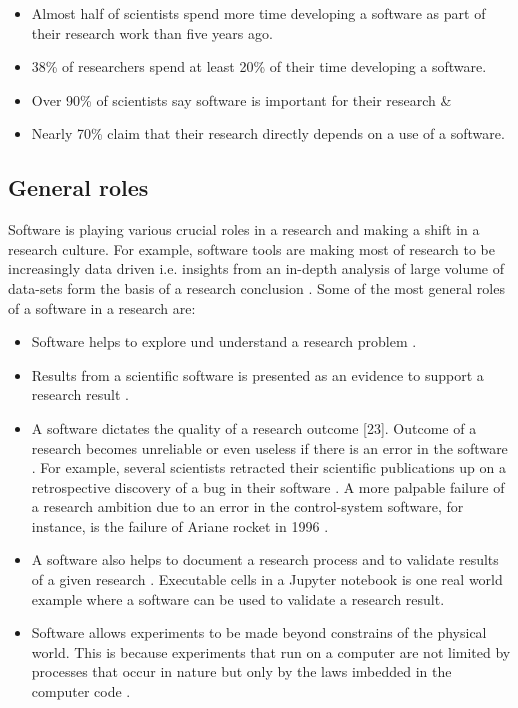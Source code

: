 \begin{itemize}[noitemsep,topsep=5pt, leftmargin=0.3in] %
	\item Almost half of scientists spend more time developing a software as part of their research work than five years ago.
	\item 38\% of researchers spend at least 20\% of their time developing a software.
	\item Over 90\% of scientists say software is important for their research \&
	\item Nearly 70\% claim that their research directly depends on a use of a software.  

\end{itemize}

\subsection{General roles}

Software is playing various crucial roles in a research and making a shift in a research culture. For example, software tools are making most of research to be increasingly data driven i.e. insights from an in-depth analysis of large volume of data-sets form the basis of a research conclusion \cite{goble2014better}\cite{jay2020software}. Some of the most general roles of a software in a research are:

\begin{itemize}[noitemsep,topsep=5pt, leftmargin=0.5in] %

	\item Software helps to explore und understand a research problem \cite{hannay2009scientists}.
	\item Results from a scientific software is presented as an evidence to support a research result \cite{kanewala2014testing}. 
	\item A software dictates the quality of a research outcome\cite{hannay2009scientists} [23]. Outcome of a research becomes unreliable or even useless if there is an error in the software \cite{soergel2014rampant}. For example, several scientists retracted their scientific publications up on a retrospective discovery of a bug in their software \cite{wilson2014best}\cite{merali2010computational}\cite{miller2006scientist}. A more palpable failure of a research ambition due to an error in the control-system software, for instance, is the failure of Ariane rocket in 1996 \cite{enwiki:1054482061}.  
	\item A software also helps to document a research process and to validate results of a given research \cite{jay2020software}. Executable cells in a Jupyter notebook is one real world example where a software can be used to validate a research result.
	\item Software allows experiments to be made beyond constrains of the physical world. This is because experiments that run on a computer are not limited by processes that occur in nature but only by the laws imbedded in the computer code \cite{wolfram1984computer}. 

\end{itemize}

